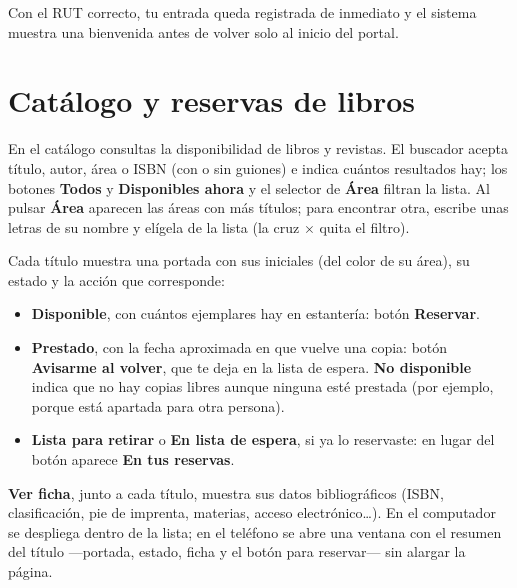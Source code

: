 \documentclass[11pt,a4paper]{report}
\begin{document}
Con el RUT correcto, tu entrada queda registrada de inmediato y el sistema
muestra una bienvenida antes de volver solo al inicio del portal.


\chapter{Catálogo y reservas de libros}

En el catálogo consultas la disponibilidad de libros y revistas. El
buscador acepta título, autor, área o ISBN (con o sin guiones) e indica
cuántos resultados hay; los botones \textbf{Todos} y \textbf{Disponibles
ahora} y el selector de \textbf{Área} filtran la lista. Al pulsar
\textbf{Área} aparecen las áreas con más títulos; para encontrar otra,
escribe unas letras de su nombre y elígela de la lista (la cruz $\times$
quita el filtro).


Cada título muestra una portada con sus iniciales (del color de su área),
su estado y la acción que corresponde:

\begin{itemize}
  \item \textbf{Disponible}, con cuántos ejemplares hay en estantería:
  botón \textbf{Reservar}.
  \item \textbf{Prestado}, con la fecha aproximada en que vuelve una copia:
  botón \textbf{Avisarme al volver}, que te deja en la lista de espera.
  \textbf{No disponible} indica que no hay copias libres aunque ninguna
  esté prestada (por ejemplo, porque está apartada para otra persona).
  \item \textbf{Lista para retirar} o \textbf{En lista de espera}, si ya lo
  reservaste: en lugar del botón aparece \textbf{En tus reservas}.
\end{itemize}

\textbf{Ver ficha}, junto a cada título, muestra sus datos bibliográficos
(ISBN, clasificación, pie de imprenta, materias, acceso
electrónico\ldots). En el computador se despliega dentro de la lista; en el
teléfono se abre una ventana con el resumen del título ---portada, estado,
ficha y el botón para reservar--- sin alargar la página.
\end{document}
